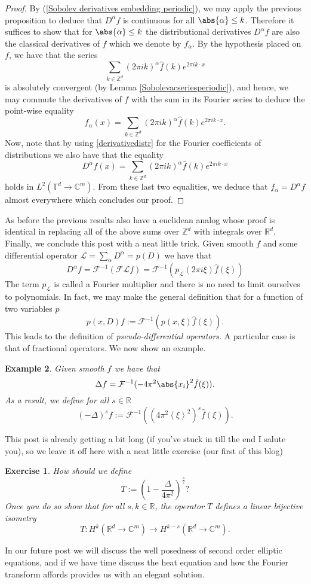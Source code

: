 \documentclass[
]{article}
\begin{document}
\emph{Proof.} By
(\protect\hyperlink{Sobolevux20derivativesux20embeddingux20periodic}{{[}Sobolev derivatives embedding periodic{]}}),
we may apply the previous proposition to deduce that \(D^\alpha f\) is
continuous for all \(\abs{\alpha}\leq k\). Therefore it suffices to show
that for \(\abs{\alpha}\leq k\) the distributional derivatives
\(D^\alpha f\) are also the classical derivatives of \(f\) which we
denote by \(f_\alpha\). By the hypothesis placed on \(f\), we have that
the series
\[\sum_{k\in{\mathbb Z}^d} (2\pi ik)^\alpha \hat{f}(k)e^{2\pi ik\cdot x}\]
is absolutely convergent (by Lemma
\protect\hyperlink{Sobolevacseriesperiodic}{{[}Sobolevacseriesperiodic{]}}),
and hence, we may commute the derivatives of \(f\) with the sum in its
Fourier series to deduce the point-wise equality
\[f_\alpha(x)=\sum_{k\in{\mathbb Z}^d} (2\pi ik)^\alpha \hat{f}(k)e^{2\pi ik\cdot x}.\]
Now, note that by using
\protect\hyperlink{derivativedistr}{{[}derivativedistr{]}} for the
Fourier coefficients of distributions we also have that the equality
\[D^\alpha f(x)=\sum_{k\in{\mathbb Z}^d} (2\pi ik)^\alpha \hat{f}(k)e^{2\pi ik\cdot x}\]
holds in \(L^2({\mathbb T}^d\to\mathbb{C}^m)\). From these last two
equalities, we deduce that \(f_\alpha=D^\alpha f\) almost everywhere
which concludes our proof.~◻

As before the previous results also have a euclidean analog whose proof
is identical in replacing all of the above sums over \({\mathbb Z}^d\)
with integrals over \({\mathbb R}^d\). Finally, we conclude this post
with a neat little trick. Given smooth \(f\) and some differential
operator \(\mathcal{L}=\sum_{\alpha} D^\alpha=p(D)\) we have that
\[D^\alpha f =\mathcal{F}^{-1}(\mathcal{F}\mathcal{L}f)=\mathcal{F}^{-1}(p_\mathcal{L}(2 \pi i\xi )\hat{f}(\xi ))\]
The term \(p_\mathcal{L}\) is called a Fourier multiplier and there is
no need to limit ourselves to polynomials. In fact, we may make the
general definition that for a function of two variables \(p\)
\[p(x,D)f:=\mathcal{F}^{-1}(p(x,\xi )\hat{f}(\xi )).\] This leads to the
definition of \emph{pseudo-differential operators}. A particular case is
that of fractional operators. We now show an example.

\textbf{Example 2}. \emph{Given smooth \(f\) we have that
\[\Delta f=\mathcal{F}^{-1}(-4 \pi^2 \abs{x_i}^2 \hat{f}(\xi )).\] As a
result, we define for all \(s\in {\mathbb R}\)
\[{(-\Delta)}^sf:=\mathcal{F}^{-1} ((4\pi^2 \left\langle\xi \right\rangle^2)^s\hat{f}(\xi )).\]}

This post is already getting a bit long (if you've stuck in till the end
I salute you), so we leave it off here with a neat little exercise (our
first of this blog)

\textbf{Exercise 1}. \emph{How should we define
	\[T:=\left(1-\frac{\Delta}{4\pi ^2}  \right)^\frac{s}{2}\text{?}\] Once
	you do so show that for all \(s,k \in {\mathbb R}\), the operator \(T\)
	defines a linear bijective isometry
	\[T: H^k({\mathbb R}^d\to\mathbb{C}^m)\to H^{k-s}({\mathbb R}^d\to\mathbb{C}^m).\]}

In our future post we will discuss the well posedness of second order
elliptic equations, and if we have time discuss the heat equation and
how the Fourier transform affords provides us with an elegant solution.
\end{document}
